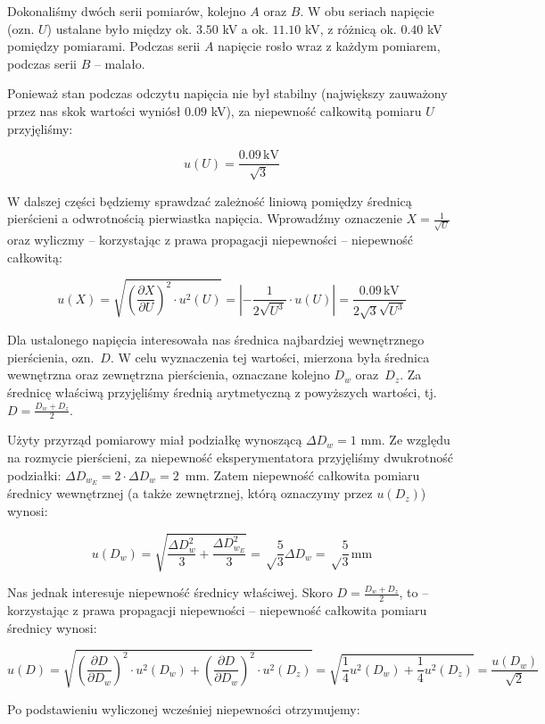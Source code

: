 \documentclass[a4paper]{article}
\newlength{\du}
\begin{document}
Dokonaliśmy dwóch serii pomiarów, kolejno $A$ oraz $B$.
W obu seriach napięcie (ozn. $U$) ustalane było między ok. $3.50$ kV a ok. $11.10$ kV, z różnicą ok. $0.40$ kV pomiędzy pomiarami.
Podczas serii $A$ napięcie rosło wraz z każdym pomiarem, podczas serii $B$ -- malało.

Ponieważ stan podczas odczytu napięcia nie był stabilny (największy zauważony przez nas skok wartości wyniósł $0.09$ kV), za niepewność całkowitą pomiaru $U$ przyjęliśmy:

$$u(U) = \frac{0.09 \, \text{kV}}{\sqrt 3}$$

W dalszej części będziemy sprawdzać zależność liniową pomiędzy średnicą pierścieni a odwrotnością pierwiastka napięcia.
Wprowadźmy oznaczenie $X = \frac{1}{\sqrt U}$ oraz wyliczmy -- korzystając z prawa propagacji niepewności -- niepewność całkowitą:

$$u(X) = \sqrt{\left(\frac{\partial X}{\partial U}\right)^2 \cdot u^2(U)} = \left| -\frac{1}{2 \sqrt{U^3}} \cdot u(U)\right| = \frac{0.09 \, \text{kV}}{2 \sqrt{3} \sqrt{U^3}}$$

Dla ustalonego napięcia interesowała nas średnica najbardziej wewnętrznego pierścienia, ozn.~$D$.
W celu wyznaczenia tej wartości, mierzona była średnica wewnętrzna oraz zewnętrzna pierścienia, oznaczane kolejno $D_w$ oraz~$D_z$.
Za średnicę właściwą przyjęliśmy średnią arytmetyczną z powyższych wartości, tj.~$D = \frac {D_w + D_z}{2}$.

Użyty przyrząd pomiarowy miał podziałkę wynoszącą $\Delta D_w = 1$ mm.
Ze względu na rozmycie pierścieni, za niepewność eksperymentatora przyjęliśmy dwukrotność podziałki: $\Delta D_{w_E} = 2 \cdot \Delta D_w = 2$~mm.
Zatem niepewność całkowita pomiaru średnicy wewnętrznej (a także zewnętrznej, którą oznaczymy przez $u(D_z)$) wynosi:

$$u(D_w) = \sqrt{\frac{\Delta D_w^2}{3} + \frac{\Delta D_{w_E}^2}{3}} = \sqrt \frac{5}{3} \Delta D_w = \sqrt \frac{5}{3} \, \text{mm}$$

Nas jednak interesuje niepewność średnicy właściwej.
Skoro $D = \frac {D_w + D_z}{2}$, to -- korzystając z prawa propagacji niepewności -- niepewność całkowita pomiaru średnicy wynosi:

$$u(D) = \sqrt{\left(\frac{\partial D}{\partial D_w}\right)^2 \cdot u^2(D_w) + \left(\frac{\partial D}{\partial D_w}\right)^2 \cdot u^2(D_z)} = \sqrt{\frac{1}{4} u^2(D_w) + \frac{1}{4} u^2(D_z)} = \frac{u(D_w)}{\sqrt{2}}$$

Po podstawieniu wyliczonej wcześniej niepewności otrzymujemy:
\end{document}
